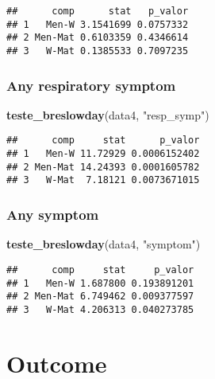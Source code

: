 \documentclass[
]{article}
\newenvironment{Shaded}{\begin{snugshade}}{\end{snugshade}}
\newcommand{\KeywordTok}[1]{\textcolor[rgb]{0.13,0.29,0.53}{\textbf{#1}}}
\newcommand{\NormalTok}[1]{#1}
\newcommand{\StringTok}[1]{\textcolor[rgb]{0.31,0.60,0.02}{#1}}
\begin{document}
\begin{verbatim}
##      comp      stat   p_valor
## 1   Men-W 3.1541699 0.0757332
## 2 Men-Mat 0.6103359 0.4346614
## 3   W-Mat 0.1385533 0.7097235
\end{verbatim}

\hypertarget{any-respiratory-symptom-3}{%
\subsubsection{Any respiratory
symptom}\label{any-respiratory-symptom-3}}

\begin{Shaded}
\begin{Highlighting}[]
\KeywordTok{teste_breslowday}\NormalTok{(data4, }\StringTok{"resp_symp"}\NormalTok{)}
\end{Highlighting}
\end{Shaded}

\begin{verbatim}
##      comp     stat      p_valor
## 1   Men-W 11.72929 0.0006152402
## 2 Men-Mat 14.24393 0.0001605782
## 3   W-Mat  7.18121 0.0073671015
\end{verbatim}

\hypertarget{any-symptom-3}{%
\subsubsection{Any symptom}\label{any-symptom-3}}

\begin{Shaded}
\begin{Highlighting}[]
\KeywordTok{teste_breslowday}\NormalTok{(data4, }\StringTok{"symptom"}\NormalTok{)}
\end{Highlighting}
\end{Shaded}

\begin{verbatim}
##      comp     stat     p_valor
## 1   Men-W 1.687800 0.193891201
## 2 Men-Mat 6.749462 0.009377597
## 3   W-Mat 4.206313 0.040273785
\end{verbatim}

\hypertarget{outcome}{%
\section{Outcome}\label{outcome}}
\end{document}
